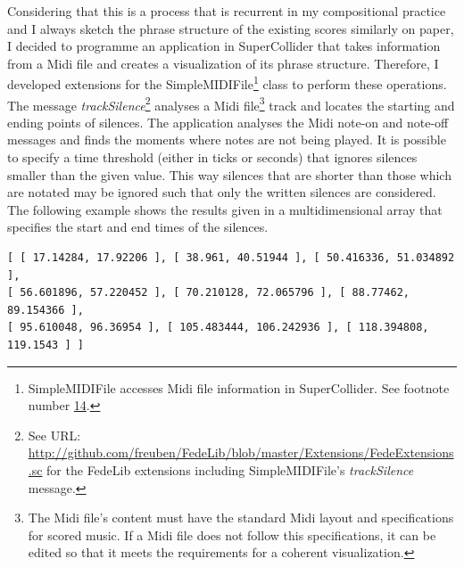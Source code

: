 Considering that this is a process that is recurrent in my compositional practice and I always sketch the phrase structure of the existing scores similarly on paper, I decided to programme an application in SuperCollider that takes information from a Midi file and creates a visualization of its phrase structure. Therefore, I developed extensions for the SimpleMIDIFile\footnote{SimpleMIDIFile accesses Midi file information in SuperCollider. See footnote number \hyperlink{wlib}{14}.} class to perform these operations. The message \emph{trackSilence}\footnote{See URL: \href{http://github.com/freuben/FedeLib/blob/master/Extensions/FedeExtensions.sc}{http://github.com/freuben/FedeLib/blob/master/Extensions/FedeExtensions.sc} for the FedeLib extensions including SimpleMIDIFile's \emph{trackSilence} message.} analyses a Midi file\footnote{The Midi file's content must have the standard Midi layout and specifications for scored music. If a Midi file does not follow this specifications, it can be edited so that it meets the requirements for a coherent visualization.} track and locates the starting and ending points of silences. The application analyses the Midi note-on and note-off messages and finds the moments where notes are not being played. It is possible to specify a time threshold (either in ticks or seconds) that ignores silences smaller than the given value. This way silences that are shorter than those which are notated may be ignored such that only the written silences are considered. The following example shows  the results given in a multidimensional array that specifies the start and end times of the silences.
\begin{verbatim}
[ [ 17.14284, 17.92206 ], [ 38.961, 40.51944 ], [ 50.416336, 51.034892 ], 
[ 56.601896, 57.220452 ], [ 70.210128, 72.065796 ], [ 88.77462, 89.154366 ], 
[ 95.610048, 96.36954 ], [ 105.483444, 106.242936 ], [ 118.394808, 119.1543 ] ]
\end{verbatim}

